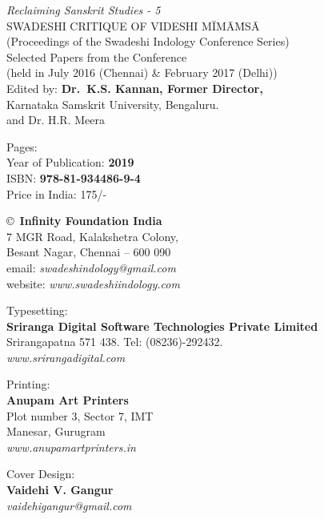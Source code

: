 \thispagestyle{empty}

\noindent
{\fontsize{9}{11}\selectfont\sl Reclaiming Sanskrit Studies - 5}\\
SWADESHI CRITIQUE OF VIDESHI MĪMĀṀSĀ\\
(Proceedings of the Swadeshi Indology Conference Series)\\
Selected Papers from the Conference\\
(held in July 2016 (Chennai) \& February 2017 (Delhi))\\
Edited by: {\bf Dr.\ K.S. Kannan, Former Director,}\\
Karnataka Samskrit University, Bengaluru.\\
and Dr. H.R. Meera
\vfill

\noindent
Pages: {\bf\pageref{bookend}}\\
Year of Publication: {\bf 2019}\\
ISBN: {\bf 978-81-934486-9-4}\\
Price in India: 175/-
\vfill

\noindent
\copyright\ {\bf Infinity Foundation India}\\ 
7 MGR Road, Kalakshetra Colony,\\ 
Besant Nagar, Chennai -- 600 090\\
email: {\sl swadeshindology@gmail.com}\\
website: {\sl www.swadeshiindology.com} 
\vfill

\noindent
Typesetting:\\ 
{\bf Sriranga Digital Software Technologies Private Limited}\\ 
Srirangapatna 571 438. Tel: (08236)-292432.\\
{\sl www.srirangadigital.com}
\vfill

\noindent
Printing:\\
{\bf Anupam Art Printers}\\
Plot number 3, Sector 7, IMT\\
Manesar, Gurugram\\
{\sl www.anupamartprinters.in}
\bigskip

\noindent
Cover Design:\\ 
{\bf Vaidehi V. Gangur}\\
{\sl vaidehigangur@gmail.com}
